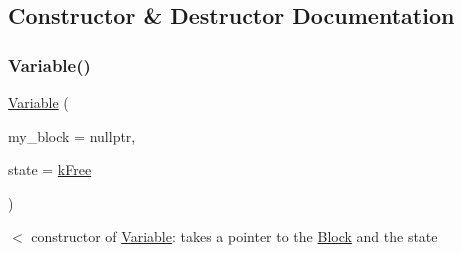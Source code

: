 \subsection{Constructor \& Destructor Documentation}
\mbox{\label{class_s_m_spp__di__unipi__it_1_1_variable_a5ffe87cf9123af2ebdcfb8c97be2f34b}} 
\subsubsection{\texorpdfstring{Variable()}{Variable()}\hspace{0.1cm}{\footnotesize\ttfamily [1/2]}}
{\footnotesize\ttfamily \mbox{\hyperlink{class_s_m_spp__di__unipi__it_1_1_variable}{Variable}} (\begin{DoxyParamCaption}\item[{\mbox{\hyperlink{class_s_m_spp__di__unipi__it_1_1_block}{Block}} $\ast$}]{my\+\_\+block = {\ttfamily nullptr},  }\item[{const \mbox{\hyperlink{class_s_m_spp__di__unipi__it_1_1_variable_a32378add5594ab0f1fb45e711d88924d}{var\+\_\+type}}}]{state = {\ttfamily \mbox{\hyperlink{class_s_m_spp__di__unipi__it_1_1_variable_a30febf04ce89c19659143fa83ae6f7baa215574cae9a84b3151d2fb68d4c4d9d1}{k\+Free}}} }\end{DoxyParamCaption})\hspace{0.3cm}{\ttfamily [inline]}}



$<$ constructor of \mbox{\hyperlink{class_s_m_spp__di__unipi__it_1_1_variable}{Variable}}\+: takes a pointer to the \mbox{\hyperlink{class_s_m_spp__di__unipi__it_1_1_block}{Block}} and the state 

